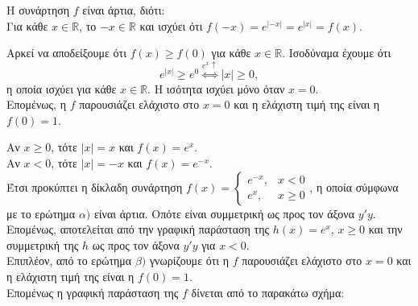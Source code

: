 \documentclass[11pt,a4paper,twoside]{book}
\begin{document}
\begin{alist}
\item Η συνάρτηση $f$ είναι άρτια, διότι: \\
Για κάθε $x \in \mathbb{R}$, το $-x \in \mathbb{R}$ και ισχύει ότι $f(-x) = e^{|-x|} = e^{|x|} = f(x)$.
\item Αρκεί να αποδείξουμε ότι $f(x) \ge f(0)$ για κάθε $x \in \mathbb{R}$. Ισοδύναμα έχουμε ότι
\[e^{|x|} \ge e^0 \overset{e^x \uparrow}{\Longleftrightarrow} |x| \ge 0,\]
η οποία ισχύει για κάθε $x \in \mathbb{R}$. Η ισότητα ισχύει μόνο όταν $x = 0$. \\
Επομένως, η $f$ παρουσιάζει ελάχιστο στο $x=0$ και η ελάχιστη τιμή της είναι η $f(0) = 1$.
\item Αν $x \ge 0$, τότε $|x| = x$ και $f(x) = e^x$. \\
Αν $x < 0$, τότε $|x| = -x$ και $f(x) = e^{-x}$. \\
Έτσι προκύπτει η δίκλαδη συνάρτηση $f(x) = \begin{cases} e^{-x}, & x < 0 \\ e^x, & x \ge 0 \end{cases}$, η οποία σύμφωνα με το ερώτημα $\alpha)$ είναι άρτια. Οπότε είναι συμμετρική ως προς τον άξονα $y'y$. \\
Επομένως, αποτελείται από την γραφική παράσταση της $h(x) = e^x$, $x \ge 0$ και την συμμετρική της $h$ ως προς τον άξονα $y'y$ για $x < 0$. \\
Επιπλέον, από το ερώτημα $\beta)$ γνωρίζουμε ότι η $f$ παρουσιάζει ελάχιστο στο $x=0$ και η ελάχιστη τιμή της είναι η $f(0) = 1$. \\
Επομένως η γραφική παράσταση της $f$ δίνεται από το παρακάτω σχήμα:
\begin{center}
\end{center}
\end{alist}
\end{document}
